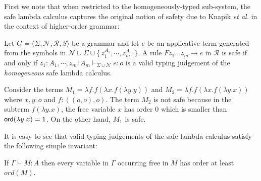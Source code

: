 \documentclass{llncs}
\newcommand\rulef[2]{\frac{\dps #1}{\dps #2}}
\newcommand{\makeset}[1]{\{\,{#1}\,\}}
\begin{document}
First we note that when restricted to the homogeneously-typed
sub-system, the safe lambda calculus captures the original notion
of safety due to Knapik \emph{et al.} in the context of higher-order
grammar:

\begin{proposition} Let $G = \langle \Sigma, \mathcal{N}, \mathcal{R},
  S \rangle$ be a grammar and let $e$ be an applicative term generated
  from the symbols in $\mathcal{N} \cup \Sigma \cup \makeset{z_1^{A_1},
    \cdots, z_m^{A_m}}$.  A rule $F z_1 \ldots z_m \rightarrow e$ in
  $\mathcal{R}$ is safe if and only if $ z_1 : A_1, \cdots, z_m : A_m
  \vdash_{\Sigma \cup \mathcal{N}} e : o$ is a valid typing judgement
  of the \emph{homogeneous} safe lambda calculus.
\end{proposition}

\begin{example}
\label{ex:kierstead}
Consider the terms $M_1 = \lambda f . f (\lambda x . f (\lambda y . y
))$ and $M_2 = \lambda f . f (\lambda x . f (\lambda y .x ))$ where
$x,y:o$ and $f:((o,o),o)$. The term $M_2$ is not safe because in the
subterm $f (\lambda y . x)$, the free variable $x$ has order $0$ which
is smaller than ${\sf ord}(\lambda y . x) = 1$.  On the other hand, $M_1$
is safe.
\end{example}

It is easy to see that valid typing judgements of the safe lambda
calculus satisfy the following simple invariant:
\begin{lemma}
\label{lem:ordfreevar}
If $\Gamma \vdash M : A$ then every variable in $\Gamma$ occurring
free in $M$ has order at least $ord(M)$.
\end{lemma}
\end{document}
